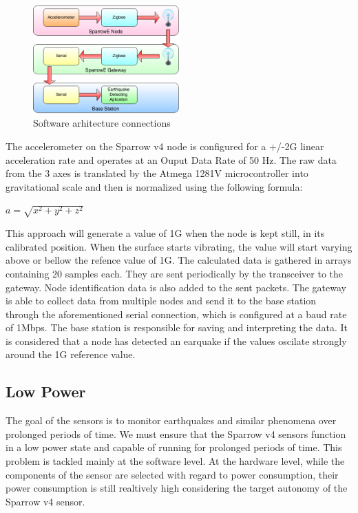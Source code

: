 \begin{figure}[ht] \centering
  \includegraphics[width=0.5\textwidth]{img/software-architecture.png}
  \caption{Software arhitecture connections}
\end{figure}

The accelerometer on the Sparrow v4 node is configured for a +/-2G linear acceleration rate and operates at an Ouput Data Rate of 50 Hz. 
The raw data from the 3 axes is translated by the Atmega 1281V microcontroller into gravitational scale and then is normalized using the following formula:

$ a = \sqrt{x^2+y^2+z^2}$

This approach will generate a value of 1G when the node is kept still, in its calibrated position. When the surface starts vibrating, the value will start varying 
above or bellow the refence value of 1G. The calculated data is gathered in arrays containing 20 samples each. They are sent periodically by the transceiver to the 
gateway. Node identification data is also added to the sent packets. The gateway is able to collect data from multiple nodes and send it to the base station through
the aforementioned serial connection, which is configured at a baud rate of 1Mbps. The base station is responsible for saving and interpreting the data. 
It is considered that a node has detected an earquake if the values oscilate strongly around the 1G reference value.


\subsection{Low Power}

The goal of the sensors is to monitor earthquakes and similar phenomena over prolonged periods of time. We must ensure that the Sparrow v4 sensors function in a low power
state and capable of running for prolonged periods of time. This problem is tackled mainly at the software level. At the hardware level, while the components of the sensor 
are selected with regard to power consumption, their power consumption is still realtively high considering the target autonomy of the Sparrow v4 sensor.

